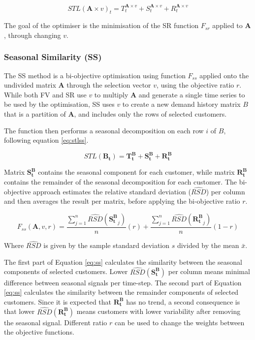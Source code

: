 \documentclass[preprint,3p,12pt,authoryear]{elsarticle}
\begin{document}
\begin{equation}
   STL (\bm{A} \times v)_t = T^{\bm{A} \times v}_t + S^{\bm{A} \times v}_t + R^{\bm{A} \times v}_t
   \label{eq:stlsr}
\end{equation}

The goal of the optimiser is the minimisation of the SR function $F_{sr}$ applied to $\bm{A}$, through changing $v$.

\subsubsection{Seasonal Similarity (SS)}
\label{sss:SS}
The SS method is a bi-objective optimisation using function $F_{ss}$ applied onto the undivided matrix $\bm{A}$ through the selection vector $v$, using the objective ratio $r$.
While both FV and SR use $v$ to multiply $\bm{A}$ and generate a single time series to be used by the optimisation, SS uses $v$ to create a new demand history matrix $B$ that is a partition of $\bm{A}$, and includes only the rows of selected customers.

The function then performs a seasonal decomposition on each row $i$ of $B$, following equation \ref{eq:stlss}.

\begin{equation}
   STL (\bm{B_t}) = \bm{T^B_t} + \bm{S^B_t} + \bm{R^B_t}
   \label{eq:stlss}
\end{equation}

Matrix $\bm{S^B_t}$ contains the seasonal component for each customer, while matrix $\bm{R^B_t}$ contains the remainder of the seasonal decomposition for each customer.
The bi-objective approach estimates the relative standard deviation ($\widehat{RSD}$) per column and then averages the result per matrix, before applying the bi-objective ratio $r$.

\begin{equation}
   F_{ss}(\bm{A},v,r) = \frac{\sum_{j=1}^{n}\widehat{RSD}({\bm{S^B_t}}_j)}{n} (r) + \frac{\sum_{j=1}^{n}\widehat{RSD}({\bm{R^B_t}}_j)}{n} (1-r)
   \label{eq:ss}
\end{equation}

Where $\widehat{RSD}$ is given by the sample standard deviation $s$ divided by the mean $\bar{x}$.

The first part of Equation \ref{eq:ss} calculates the similarity between the seasonal components of selected customers. Lower $\widehat{RSD}(\bm{S^B_t})$ per column means minimal difference between seasonal signals per time-step. The second part of Equation \ref{eq:ss} calculates the similarity between the remainder components of selected customers. Since it is expected that $\bm{R^B_t}$ has no trend, a second consequence is that lower $\widehat{RSD}(\bm{R^B_t})$ means customers with lower variability after removing the seasonal signal. Different ratio $r$ can be used to change the weights between the objective functions.
\end{document}
